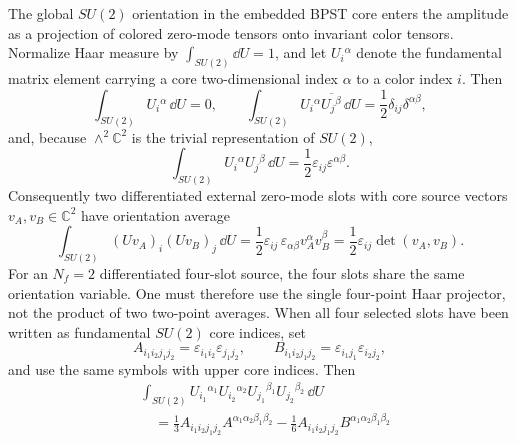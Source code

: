 \begin{proposition}
\label{prop:instanton-color-orientation-haar-projection}
The global \(SU(2)\) orientation in the embedded BPST core enters the
amplitude as a projection of colored zero-mode tensors onto invariant color
tensors.  Normalize Haar measure by \(\int_{SU(2)}\dd U=1\), and let
\(U_i{}^\alpha\) denote the fundamental matrix element carrying a core
two-dimensional index \(\alpha\) to a color index \(i\).  Then
\begin{equation}
  \int_{SU(2)} U_i{}^\alpha\,\dd U=0,\qquad
  \int_{SU(2)}
    U_i{}^\alpha \overline{U_j{}^\beta}\,\dd U
  =
  \frac12\delta_{ij}\delta^{\alpha\beta},
  \label{eq:instanton-orientation-one-slot-projection}
\end{equation}
and, because \(\wedge^2\mathbb C^2\) is the trivial representation of
\(SU(2)\),
\begin{equation}
  \int_{SU(2)}
    U_i{}^\alpha U_j{}^\beta\,\dd U
  =
  \frac12\varepsilon_{ij}\varepsilon^{\alpha\beta}.
  \label{eq:instanton-orientation-two-slot-projection}
\end{equation}
Consequently two differentiated external zero-mode slots with core source
vectors \(v_A,v_B\in\mathbb C^2\) have orientation average
\begin{equation}
  \int_{SU(2)}
    (Uv_A)_i(Uv_B)_j\,\dd U
  =
  \frac12\varepsilon_{ij}\,
  \varepsilon_{\alpha\beta}v_A^\alpha v_B^\beta
  =
  \frac12\varepsilon_{ij}\det(v_A,v_B).
  \label{eq:instanton-orientation-two-slot-determinant}
\end{equation}
For an \(N_f=2\) differentiated four-slot source, the four slots share the same
orientation variable.  One must therefore use the single four-point Haar
projector, not the product of two two-point averages.  When all four selected
slots have been written as fundamental \(SU(2)\) core indices, set
\[
  A_{i_1i_2j_1j_2}
  =
  \varepsilon_{i_1i_2}\varepsilon_{j_1j_2},
  \qquad
  B_{i_1i_2j_1j_2}
  =
  \varepsilon_{i_1j_1}\varepsilon_{i_2j_2},
\]
and use the same symbols with upper core indices.  Then
\begin{equation}
\begin{aligned}
  &\int_{SU(2)}
    U_{i_1}{}^{\alpha_1}U_{i_2}{}^{\alpha_2}
    U_{j_1}{}^{\beta_1}U_{j_2}{}^{\beta_2}\,\dd U       \\
  &\quad =
  \frac13 A_{i_1i_2j_1j_2}A^{\alpha_1\alpha_2\beta_1\beta_2}
  -\frac16 A_{i_1i_2j_1j_2}B^{\alpha_1\alpha_2\beta_1\beta_2} \\

\end{aligned}
\end{equation}
\end{proposition}
